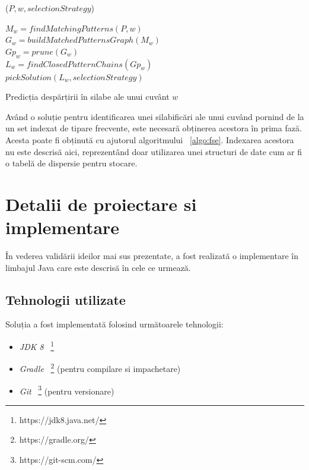 \begin{algorithm}
\SetAlgoLined
{}

\ppg($P, w, selectionStrategy$) \\

$M_w = findMatchingPatterns(P,w)$ \\
$G_w = buildMatchedPatternsGraph(M_w)$ \\
$Gp_w = prune(G_w)$ \\
$L_w = findClosedPatternChains(Gp_w)$ \\
\KwRet $pickSolution(L_w, selectionStrategy)$
\vspace{1cm}

\caption{Predicția despărțirii în silabe ale unui cuvânt $w$}
\label{algo:rosil}
\end{algorithm}

Având o soluție pentru identificarea unei silabificări ale unui cuvând pornind de la un set indexat de tipare frecvente, este necesară obținerea acestora în prima fază. Acesta poate fi obținută cu ajutorul algoritmului ~\ref{algo:fse}. Indexarea acestora nu este descrisă aici, reprezentând doar utilizarea unei structuri de date cum ar fi o tabelă de dispersie pentru stocare. 

\chapter{Detalii de proiectare si implementare}

În vederea validării ideilor mai sus prezentate, a fost realizată o implementare în limbajul Java care este descrisă în cele ce urmează.

\section{Tehnologii utilizate}

Soluția a fost implementată folosind următoarele tehnologii:

\begin{itemize}
	\item \textit{JDK 8} ~\footnote{https://jdk8.java.net/}
	\item \textit{Gradle} ~\footnote{https://gradle.org/} (pentru compilare si impachetare)
	\item \textit{Git} ~\footnote{https://git-scm.com/} (pentru versionare)
\end{itemize}

